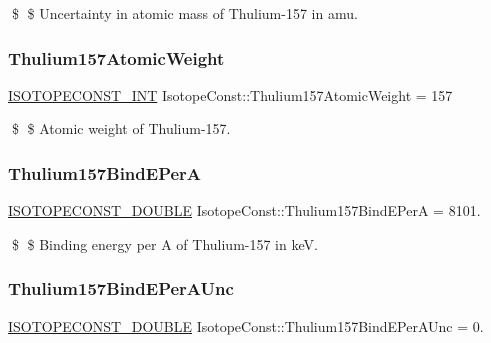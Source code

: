 \$ \$ Uncertainty in atomic mass of Thulium-\/157 in amu. \mbox{\label{group___isotope_const-_thulium-_tm157_ga497f34130dcb61a1179345b8efc9a036}} 
\subsubsection{\texorpdfstring{Thulium157\+Atomic\+Weight}{Thulium157AtomicWeight}}
{\footnotesize\ttfamily \mbox{\hyperlink{group___isotope_const-_macros_ga5f18360b3e99483a35c32d789e62621c}{I\+S\+O\+T\+O\+P\+E\+C\+O\+N\+S\+T\+\_\+\+I\+NT}} Isotope\+Const\+::\+Thulium157\+Atomic\+Weight = 157}

\$ \$ Atomic weight of Thulium-\/157. \mbox{\label{group___isotope_const-_thulium-_tm157_ga5b520e090b261278a5d2d7bc851477e2}} 
\subsubsection{\texorpdfstring{Thulium157\+Bind\+E\+PerA}{Thulium157BindEPerA}}
{\footnotesize\ttfamily \mbox{\hyperlink{group___isotope_const-_macros_ga8f45a7272ce02c0b4c65c44636ed719a}{I\+S\+O\+T\+O\+P\+E\+C\+O\+N\+S\+T\+\_\+\+D\+O\+U\+B\+LE}} Isotope\+Const\+::\+Thulium157\+Bind\+E\+PerA = 8101.}

\$ \$ Binding energy per A of Thulium-\/157 in keV. \mbox{\label{group___isotope_const-_thulium-_tm157_ga36fb02914740a28eb50f4d9472d139d9}} 
\subsubsection{\texorpdfstring{Thulium157\+Bind\+E\+Per\+A\+Unc}{Thulium157BindEPerAUnc}}
{\footnotesize\ttfamily \mbox{\hyperlink{group___isotope_const-_macros_ga8f45a7272ce02c0b4c65c44636ed719a}{I\+S\+O\+T\+O\+P\+E\+C\+O\+N\+S\+T\+\_\+\+D\+O\+U\+B\+LE}} Isotope\+Const\+::\+Thulium157\+Bind\+E\+Per\+A\+Unc = 0.}

